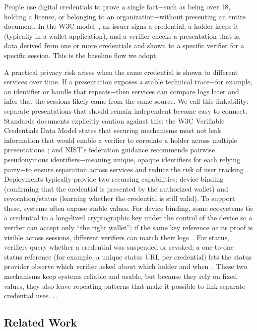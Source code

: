 People use digital credentials to prove a single fact$-$such as being over 18, holding a license, or belonging to an organization$-$without presenting an entire document. In the W3C model~\cite{w3c-vc-data-model-2}, an issuer signs a credential, a holder keeps it (typically in a wallet application), and a verifier checks a presentation-that is, data derived from one or more credentials and shown to a specific verifier for a specific session. This is the baseline flow we adopt.

A practical privacy risk arises when the same credential is shown to different services over time. If a presentation exposes a stable technical trace$-$for example, an identifier or handle that repeats$-$then services can compare logs later and infer that the sessions likely came from the same source.
We call this linkability: separate presentations that should remain independent become easy to connect. Standards documents explicitly caution against this: the W3C Verifiable Credentials Data Model states that securing mechanisms must not leak information that would enable a verifier to correlate a holder across multiple presentations~\cite{w3c-vc-data-model-2}; and NIST’s federation guidance recommends pairwise pseudonymous identifiers$-$meaning unique, opaque identifiers for each relying party$-$to ensure separation across services and reduce the risk of user tracking~\cite{nist-sp800-63c}.
Deployments typically provide two recurring capabilities: device binding (confirming that the credential is presented by the authorized wallet) and revocation/status (learning whether the credential is still valid). To support these, systems often expose stable values.
For device binding, some ecosystems tie a credential to a long-lived cryptographic key under the control of the device so a verifier can accept only “the right wallet”; if the same key reference or its proof is visible across sessions, different verifiers can match their logs~\cite{IETF:FetYasCam25}.
For status, verifiers query whether a credential was suspended or revoked; a one-to-one status reference (for example, a unique status URL per credential) lets the status provider observe which verifier asked about which holder and when~\cite{w3c-vc-data-model-2}.
These two mechanisms keep systems reliable and usable, but because they rely on fixed values, they also leave repeating patterns that make it possible to link separate credential uses.
\dots
\subsection{Related Work}

